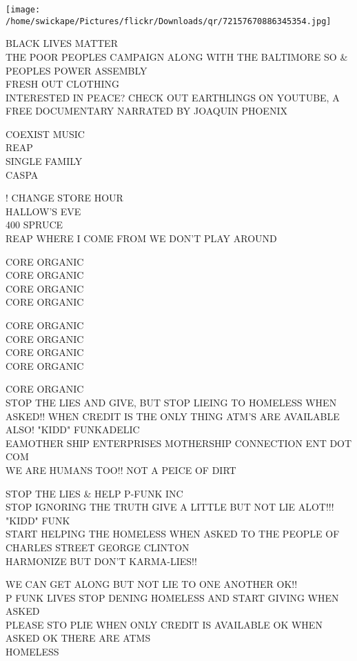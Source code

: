 \documentclass[10pt,letterpaper]{article}
\begin{document}
\texttt{[image: /home/swickape/Pictures/flickr/Downloads/qr/72157670886345354.jpg]}


BLACK LIVES MATTER\\
THE POOR PEOPLES CAMPAIGN ALONG WITH THE BALTIMORE SO \& PEOPLES POWER ASSEMBLY\\
FRESH OUT CLOTHING\\
INTERESTED IN PEACE?  CHECK OUT EARTHLINGS ON YOUTUBE, A FREE DOCUMENTARY NARRATED BY JOAQUIN PHOENIX

COEXIST MUSIC\\
REAP\\
SINGLE FAMILY\\
CASPA

! CHANGE STORE HOUR\\
HALLOW'S EVE\\
400 SPRUCE\\
REAP WHERE I COME FROM WE DON'T PLAY AROUND

CORE ORGANIC\\
CORE ORGANIC\\
CORE ORGANIC\\
CORE ORGANIC

CORE ORGANIC\\
CORE ORGANIC\\
CORE ORGANIC\\
CORE ORGANIC

CORE ORGANIC\\
STOP THE LIES AND GIVE, BUT STOP LIEING TO HOMELESS WHEN ASKED!! WHEN CREDIT IS THE ONLY THING ATM'S ARE AVAILABLE ALSO! "KIDD" FUNKADELIC\\
EAMOTHER SHIP ENTERPRISES MOTHERSHIP CONNECTION ENT DOT COM\\
WE ARE HUMANS TOO!! NOT A PEICE OF DIRT

STOP THE LIES \& HELP P{-}FUNK INC\\
STOP IGNORING THE TRUTH GIVE A LITTLE BUT NOT LIE ALOT!!! "KIDD" FUNK\\
START HELPING THE HOMELESS WHEN ASKED TO THE PEOPLE OF CHARLES STREET GEORGE CLINTON\\
HARMONIZE BUT DON'T KARMA{-}LIES!!

WE CAN GET ALONG BUT NOT LIE TO ONE ANOTHER OK!!\\
P FUNK LIVES STOP DENING HOMELESS AND START GIVING WHEN ASKED\\
PLEASE STO PLIE WHEN ONLY CREDIT IS AVAILABLE OK WHEN ASKED OK THERE ARE ATMS\\
HOMELESS
\end{document}
